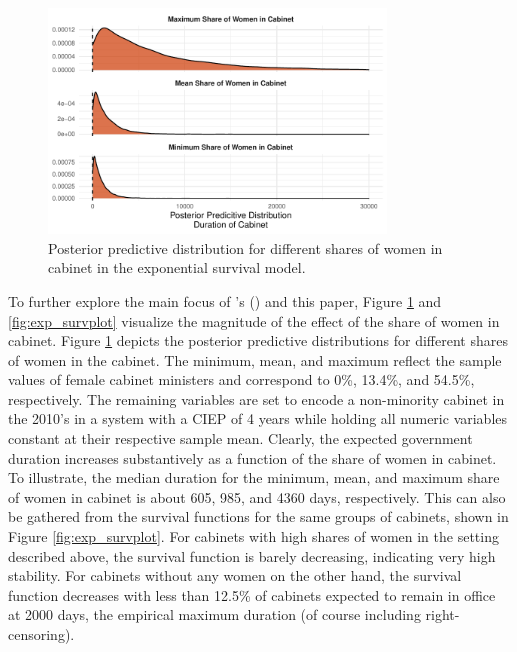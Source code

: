 \documentclass[11pt]{article}
\newcommand\possecite[1]{\citeauthor{#1}'s (\citeyear{#1})}
\newcommand\minp[1]{\begin{minipage}{0.8\textwidth} #1 \end{minipage}}
\begin{document}
\begin{figure}[!ht]
    \centering
    \minp{\caption{Posterior predictive distribution for different shares of women in cabinet in the exponential survival model.} \label{fig:exp_posteriorpredict}}
    \includegraphics[width = 0.8\textwidth]{figures/fig3_exp_posteriorpredict.pdf}
\end{figure}

To further explore the main focus of \possecite{KK20} and this paper, Figure \ref{fig:exp_posteriorpredict} and \ref{fig:exp_survplot} visualize the magnitude of the effect of the share of women in cabinet. Figure \ref{fig:exp_posteriorpredict} depicts the posterior predictive distributions for different shares of women in the cabinet. The minimum, mean, and maximum reflect the sample values of female cabinet ministers and correspond to 0\%, 13.4\%, and 54.5\%, respectively. The remaining variables are set to encode a non-minority cabinet in the 2010's in a system with a CIEP of 4 years while holding all numeric variables constant at their respective sample mean. Clearly, the expected government duration increases substantively as a function of the share of women in cabinet. To illustrate, the median duration for the minimum, mean, and maximum share of women in cabinet is about 605, 985, and 4360 days, respectively. This can also be gathered from the survival functions for the same groups of cabinets, shown in Figure \ref{fig:exp_survplot}. For cabinets with high shares of women in the setting described above, the survival function is barely decreasing, indicating very high stability. For cabinets without any women on the other hand, the survival function decreases with less than 12.5\% of cabinets expected to remain in office at 2000 days, the empirical maximum duration (of course including right-censoring). 
\end{document}
